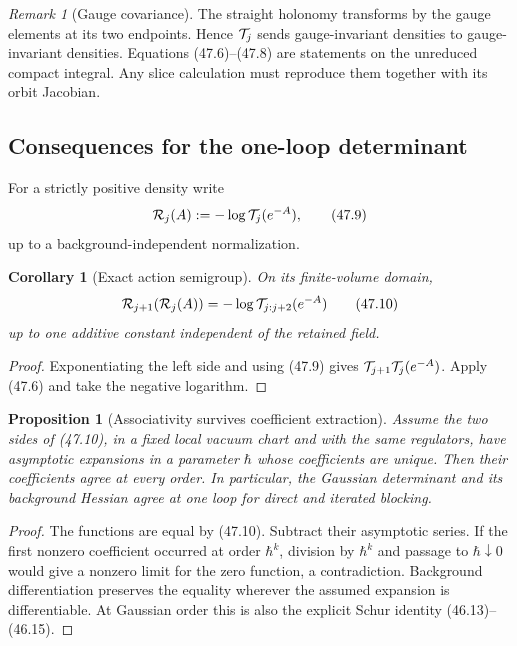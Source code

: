 \documentclass[11pt,oneside]{book}
\newtheorem{proposition}[theorem]{Proposition}
\newtheorem{corollary}[theorem]{Corollary}
\theoremstyle{definition}
\theoremstyle{remark}
\newtheorem{remark}[theorem]{Remark}
\begin{document}
\begin{remark}[Gauge covariance]
\label{rem:e8v47-gauge-covariance}
The straight holonomy transforms by the gauge elements at its two
endpoints.  Hence \({\cal T}_j\) sends gauge-invariant densities to
gauge-invariant densities.  Equations (47.6)--(47.8) are statements
on the unreduced compact integral.  Any slice calculation must
reproduce them together with its orbit Jacobian.
\end{remark}

\subsection{Consequences for the one-loop determinant}

For a strictly positive density write
\[
 {\cal R}_j(A):=-\log{\cal T}_j(e^{-A}),                       \tag{47.9}
\]
up to a background-independent normalization.

\begin{corollary}[Exact action semigroup]
\label{cor:e8v47-action-semigroup}
On its finite-volume domain,
\[
 {\cal R}_{j+1}({\cal R}_j(A))
 =-\log{\cal T}_{j:j+2}(e^{-A})                               \tag{47.10}
\]
up to one additive constant independent of the retained field.
\end{corollary}

\begin{proof}
Exponentiating the left side and using (47.9) gives
\({\cal T}_{j+1}{\cal T}_j(e^{-A})\).  Apply (47.6) and take the
negative logarithm.
\end{proof}

\begin{proposition}[Associativity survives coefficient extraction]
\label{prop:e8v47-loop-associativity}
Assume the two sides of (47.10), in a fixed local vacuum chart and
with the same regulators, have asymptotic expansions in a parameter
\(\hbar\) whose coefficients are unique.  Then their coefficients
agree at every order.  In particular, the Gaussian determinant and
its background Hessian agree at one loop for direct and iterated
blocking.
\end{proposition}

\begin{proof}
The functions are equal by (47.10).  Subtract their asymptotic
series.  If the first nonzero coefficient occurred at order
\(\hbar^k\), division by \(\hbar^k\) and passage to
\(\hbar\downarrow0\) would give a nonzero limit for the zero
function, a contradiction.  Background differentiation preserves
the equality wherever the assumed expansion is differentiable.
At Gaussian order this is also the explicit Schur identity
(46.13)--(46.15).
\end{proof}
\end{document}
